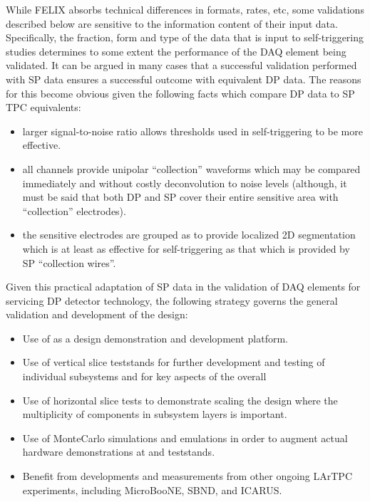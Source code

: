 While FELIX absorbs technical differences in formats, rates, etc, some
validations described below are sensitive to the information content of
their input data. 
Specifically, the fraction, form and type of the data that is input to
self-triggering studies determines to some extent the performance of the
DAQ element being validated.
It can be argued in many cases that a successful validation performed
with SP data ensures a successful outcome with equivalent DP data.
The reasons for this become obvious given the following facts which
compare DP  data to SP TPC equivalents:
\begin{itemize}
\item larger signal-to-noise ratio allows thresholds used in
  self-triggering to be more effective.
\item all channels provide unipolar ``collection'' waveforms which may
  be compared immediately and without costly deconvolution to noise
  levels (although, it must be said that both DP and SP cover their
  entire sensitive area with ``collection'' electrodes).
\item the sensitive electrodes are grouped as to provide localized 2D
  segmentation which is at least as effective for self-triggering as
  that which is provided by SP ``collection wires''.
\end{itemize}


Given this practical adaptation of SP data in the validation of DAQ
elements for servicing DP detector technology, the following strategy
governs the general validation and development of the 
  design:
\begin{itemize}
\item Use of  as a design demonstration and
  development platform. 
\item Use of vertical slice teststands for further development and testing of
  individual  subsystems and for key aspects of the
  overall 
\item Use of horizontal slice tests to demonstrate scaling the design
  where the multiplicity of components in subsystem layers is important.
\item Use of  MonteCarlo simulations and emulations in order
  to augment actual hardware demonstrations at  and teststands.
\item Benefit from developments and measurements from other ongoing
  LArTPC experiments, including MicroBooNE, SBND, and ICARUS.
\end{itemize}

